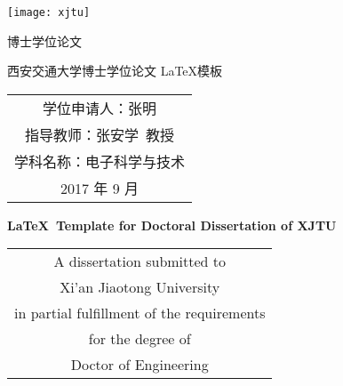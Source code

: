 
\begin{titlepage}
	\begin{center}
		\begin{figure*}[!ht]\vspace{5em}
			\centering
			\texttt{[image: xjtu]}
		\end{figure*}
		
		\vspace{1.5em}
		\begin{center} { 博士学位论文} \end{center}
		
		\vspace{8.5em}
		\begin{center} {\sanhao\hei 西安交通大学博士学位论文 \LaTeX 模板}\end{center}
		
		\vspace{16em}
		{\sanhao
			\begin{center} \renewcommand{\arraystretch}{1.75}
				\begin{tabular}{c}
					学位申请人：张明 \\
					指导教师：张安学~教授 \\
					学科名称：电子科学与技术 \\
					2017 年 9 月 \\
				\end{tabular} \renewcommand{\arraystretch}{1}
			\end{center} 
		}
	\end{center}
	\clearpage{\pagestyle{empty}\cleardoublepage}
	
	\newpage\thispagestyle{empty}
	\begin{center}
		\parbox[t][0.7cm][t]{\textwidth}{}
		
		\begin{center}{\sanhao\bfseries \LaTeX~Template for Doctoral Dissertation of XJTU}\end{center}
		
		\vspace{4.7cm}
		{\sanhao
			\begin{center} \renewcommand{\arraystretch}{1.4}
				\begin{tabular}{c}
					A dissertation submitted to  \\
					Xi'an Jiaotong University \\
					in partial fulfillment of the requirements \\
					for the degree of \\
					Doctor of Engineering \\
				\end{tabular} \renewcommand{\arraystretch}{1}
			\end{center} 
		}
			

\end{center}
\end{titlepage}
